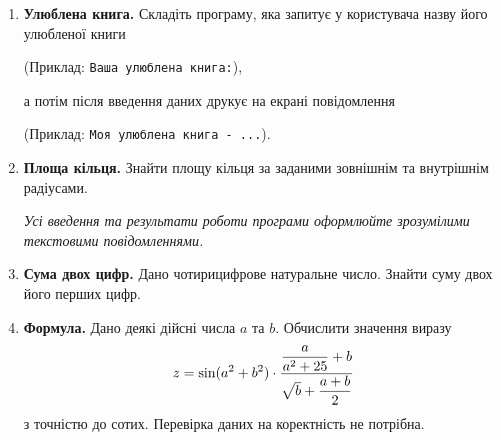 \begin{enumerate}

\item \textbf{Улюблена книга.} Складіть програму, яка запитує у користувача назву його улюбленої книги

(Приклад: \verb|Ваша улюблена книга:|),

а потім після введення даних друкує на екрані повідомлення

(Приклад: \verb|Моя улюблена книга - ...|).

\item \textbf{Площа кільця.} Знайти площу кільця за заданими зовнішнім та внутрішнім радіусами.

{\itshape Усі введення та результати роботи програми оформлюйте зрозумілими текстовими повідомленнями.}

\item \textbf{Сума двох цифр.} Дано чотирицифрове натуральне число. Знайти суму двох його перших цифр.

\item \textbf{Формула.} Дано деякі дійсні числа $a$ та $b$. Обчислити значення виразу
$$
z=\sin(a^2+b^2)\cdot\dfrac{\dfrac{a}{a^2+25}+b}{\sqrt{\mathstrut b}+\dfrac{a+b}{ 2}}
$$
з точністю до сотих. Перевірка даних на коректність не потрібна.
\end{enumerate}




